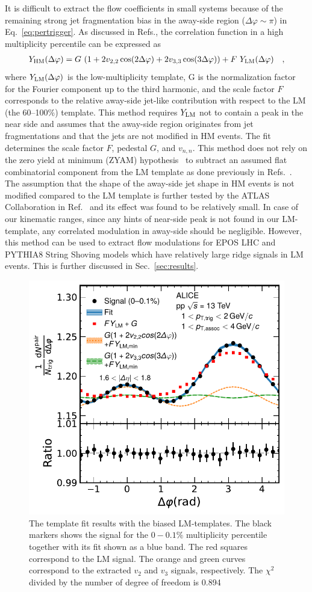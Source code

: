 It is difficult to extract the flow coefficients in small systems because of the remaining strong jet fragmentation bias in the away-side region ($\Delta\varphi \sim \pi$) in Eq.~\ref{eq:pertrigger}. As discussed in Refs.\cite{ATLAS:2015hzw,ATLAS:2016yzd}, the correlation function in a high multiplicity percentile can be expressed as 
\begin{eqnarray}
Y_{\rm{HM}}(\Delta\varphi) = G~(1 + 2v_{2,2}\cos(2\Delta\varphi) + 2v_{3,3}\cos(3\Delta\varphi)) + F~Y_{\rm{LM}}(\Delta\varphi) \quad,
\end{eqnarray}
where $Y_{\rm{LM}}(\Delta\varphi)$ is the low-multiplicity template, G is the normalization factor for the Fourier component up to the third harmonic, and the scale factor $F$ corresponds to the relative away-side jet-like contribution with respect to the LM (the 60--100\%) template. This method requires $Y_{\rm{LM}}$ not to contain a peak in the near side and assumes that the away-side region originates from jet fragmentations and that the jets are not modified in HM events. The fit determines the scale factor $F$, pedestal $G$, and $v_{n,n}$. This method does not rely on the zero yield at minimum (ZYAM) hypothesis~\cite{Ajitanand:2005jj} to subtract an assumed flat combinatorial component from the LM template as done previously in Refs.~\cite{ATLAS:2012cix,ATLAS:2014qaj}. The assumption that the shape of the away-side jet shape in HM events is not modified compared to the LM template is further tested by the ATLAS Collaboration in Ref.~\cite{ATLAS:2018ngv} and its effect was found to be relatively small. In case of our kinematic ranges, since any hints of near-side peak is not found in our LM-template, any correlated modulation in away-side should be negligible. However, this method can be used to extract flow modulations for EPOS LHC and PYTHIA8 String Shoving models which have relatively large ridge signals in LM events. This is further discussed in Sec.~\ref{sec:results}.

\begin{figure}[h!]
	\centering
	\includegraphics[width=0.6 \textwidth]{figures/Fig1_FlowExt.pdf} 
	\caption{The template fit results with the biased LM-templates. The black markers shows the signal for the $0-0.1\%$ multiplicity percentile together with its fit shown as a blue band. The red squares correspond to the LM signal. The orange and green curves correspond to the extracted $v_2$ and $v_3$ signals, respectively. The $\chi^{2}$ divided by the number of degree of freedom is 0.894}
	\label{fig:flowext}
\end{figure}

